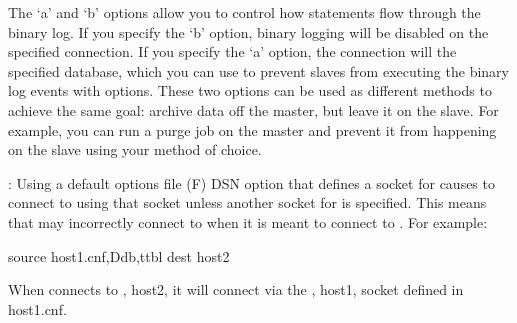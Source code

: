 \documentclass[letterpaper,10pt,english]{sphinxmanual}
\begin{document}
\begin{fulllineitems}
The ‘a’ and ‘b’ options allow you to control how statements flow through the
binary log.  If you specify the ‘b’ option, binary logging will be disabled on
the specified connection.  If you specify the ‘a’ option, the connection will
 the specified database, which you can use to prevent slaves from
executing the binary log events with  options.  These
two options can be used as different methods to achieve the same goal: archive
data off the master, but leave it on the slave.  For example, you can run a
purge job on the master and prevent it from happening on the slave using your
method of choice.

: Using a default options file (F) DSN option that defines a
socket for {\hyperref[\detokenize{mariadb-archiver:cmdoption-mariadb-archiver-source}]{}} causes  to connect to {\hyperref[\detokenize{mariadb-archiver:cmdoption-mariadb-archiver-dest}]{}} using
that socket unless another socket for {\hyperref[\detokenize{mariadb-archiver:cmdoption-mariadb-archiver-dest}]{}} is specified.  This
means that  may incorrectly connect to {\hyperref[\detokenize{mariadb-archiver:cmdoption-mariadb-archiver-source}]{}} when it
is meant to connect to {\hyperref[\detokenize{mariadb-archiver:cmdoption-mariadb-archiver-dest}]{}}.  For example:

\begin{sphinxVerbatim}[commandchars=\\\{\}]
\PYGZhy{}\PYGZhy{}source host1.cnf,Ddb,ttbl \PYGZhy{}\PYGZhy{}dest host2
\end{sphinxVerbatim}

When  connects to {\hyperref[\detokenize{mariadb-archiver:cmdoption-mariadb-archiver-dest}]{}}, host2, it will connect via the
{\hyperref[\detokenize{mariadb-archiver:cmdoption-mariadb-archiver-source}]{}}, host1, socket defined in host1.cnf.

\end{fulllineitems}
\end{document}
